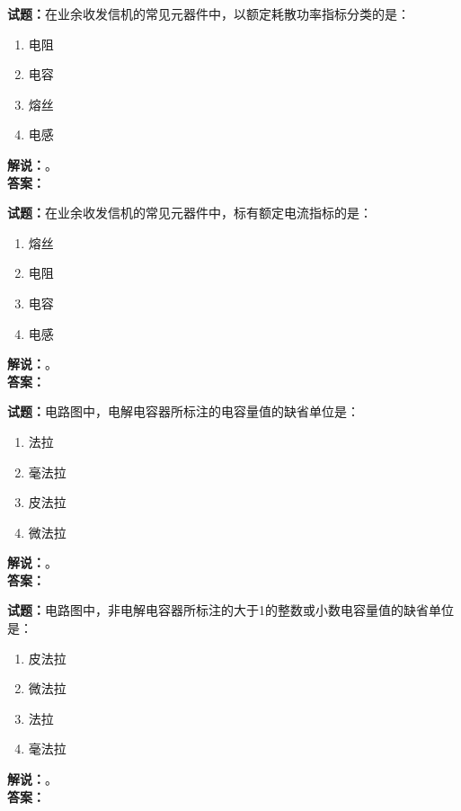 \documentclass{ctexbook}
\begin{document}
\bigskip




\noindent\textbf{试题：}在业余收发信机的常见元器件中，以额定耗散功率指标分类的是：
\begin{enumerate}[leftmargin=3em]
\item 电阻
\item 电容
\item 熔丝
\item 电感
\end{enumerate}
\noindent\textbf{解说：}\textbf{}。\\\noindent\textbf{答案：}

\bigskip




\noindent\textbf{试题：}在业余收发信机的常见元器件中，标有额定电流指标的是：
\begin{enumerate}[leftmargin=3em]
\item 熔丝
\item 电阻
\item 电容
\item 电感
\end{enumerate}
\noindent\textbf{解说：}\textbf{}。\\\noindent\textbf{答案：}

\bigskip




\noindent\textbf{试题：}电路图中，电解电容器所标注的电容量值的缺省单位是：
\begin{enumerate}[leftmargin=3em]
\item 法拉
\item 毫法拉
\item 皮法拉
\item 微法拉
\end{enumerate}
\noindent\textbf{解说：}\textbf{}。\\\noindent\textbf{答案：}

\bigskip




\noindent\textbf{试题：}电路图中，非电解电容器所标注的大于1的整数或小数电容量值的缺省单位是：
\begin{enumerate}[leftmargin=3em]
\item 皮法拉
\item 微法拉
\item 法拉
\item 毫法拉
\end{enumerate}
\noindent\textbf{解说：}\textbf{}。\\\noindent\textbf{答案：}
\end{document}
